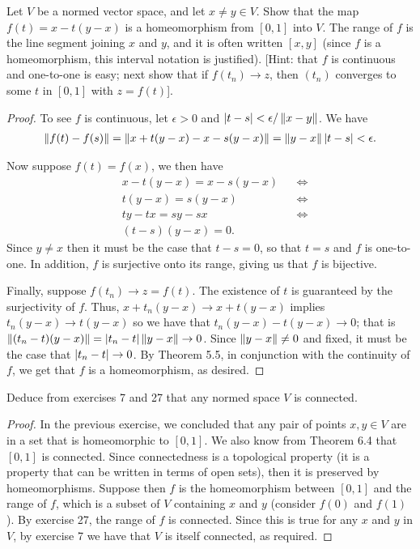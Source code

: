 \begin{exercise}{27}
Let $V$ be a normed vector space, and let $x\neq y\in V$.
Show that the map $f(t)=x-t(y-x)$ is a homeomorphism from $[0,1]$ into $V$.
The range of $f$ is the line segment joining $x$ and $y$, and it is often written $[x,y]$ (since $f$ is a homeomorphism, this interval notation is justified).
[Hint: that $f$ is continuous and one-to-one is easy; next show that if $f(t_n)\to z$, then $(t_n)$ converges to some $t$ in $[0,1]$ with $z=f(t)$].
\end{exercise}
\begin{proof}
To see $f$ is continuous, let $\epsilon>0$ and $\left\lvert t-s\right\rvert<\epsilon/\left\lVert x-y\right\rVert$.
We have
\begin{align*}
    \left\lVert f(t)-f(s)\right\rVert 
    = \left\lVert x+t(y-x)-x-s(y-x)\right\rVert
    = \left\lVert y-x\right\rVert\left\lvert t-s\right\rvert
    < \epsilon.
\end{align*}

Now suppose $f(t)=f(x)$, we then have
\begin{align*}
    &x-t(y-x) = x-s(y-x) &&\iff\\
    &t(y-x) = s(y-x) &&\iff\\
    &ty-tx = sy-sx &&\iff\\
    &(t-s)(y-x) = 0.
\end{align*}
Since $y\neq x$ then it must be the case that $t-s=0$, so that $t=s$ and $f$ is one-to-one.
In addition, $f$ is surjective onto its range, giving us that $f$ is bijective.

Finally, suppose $f(t_n)\to z = f(t)$.
The existence of $t$ is guaranteed by the surjectivity of $f$.
Thus, $x+t_n(y-x) \to x+t(y-x)$ implies $t_n(y-x) \to t(y-x)$ so we have that $t_n(y-x)-t(y-x) \to 0$;
that is $\left\lVert (t_n-t)(y-x)\right\rVert=\left\lvert t_n-t\right\rvert\left\lVert y-x\right\rVert\to 0 $.
Since $\left\lVert y-x\right\rVert\neq 0$ and fixed, it must be the case that $\left\lvert t_n-t\right\rvert\to 0$.
By Theorem 5.5, in conjunction with the continuity of $f$, we get that $f$ is a homeomorphism, as desired. 
\end{proof} 

\begin{exercise}{28}
Deduce from exercises 7 and 27 that any normed space $V$ is connected.
\end{exercise}
\begin{proof}
In the previous exercise, we concluded that any pair of points $x,y\in V$ are in a set that is homeomorphic to $[0,1]$.
We also know from Theorem 6.4 that $[0,1]$ is connected.
Since connectedness is a topological property (it is a property that can be written in terms of open sets), then it is preserved by homeomorphisms.
Suppose then $f$ is the homeomorphism between $[0,1]$ and the range of $f$, which is a subset of $V$ containing $x$ and $y$ (consider $f(0)$ and $f(1)$).
By exercise 27, the range of $f$ is connected.
Since this is true for any $x$ and $y$ in $V$, by exercise 7 we have that $V$ is itself connected, as required.
\end{proof} 
